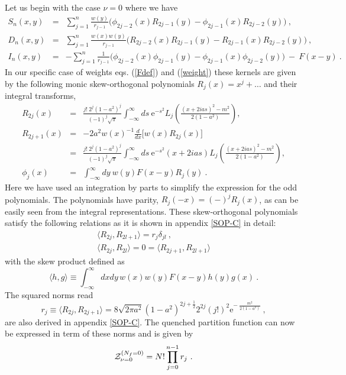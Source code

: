 \documentclass[11pt]{article}
\newcommand{\be}{\begin{equation}}
\newcommand{\ee}{\end{equation}}
\newcommand{\bea}{\begin{eqnarray}}
\newcommand{\eea}{\end{eqnarray}}
\newcommand{\nn}{\nonumber}
\newcommand{\e}{\mbox{e}}
\begin{document}
Let us begin with the case $\nu=0$ where we have \cite{NF98}
\bea
S_n(x,y)&=& \sum_{j=1}^n\frac{w(y)}{r_{j-1}}
\Big(\phi_{2j-2}(x)R_{2j-1}(y)-\phi_{2j-1}(x)R_{2j-2}(y)
\Big)\ ,\nn\\
D_n(x,y)&=& \sum_{j=1}^n\frac{w(x)w(y)}{r_{j-1}}
\Big(R_{2j-2}(x)R_{2j-1}(y)-R_{2j-1}(x)R_{2j-2}(y)
\Big)\ ,\nn\\
I_n(x,y)&=&- \sum_{j=1}^n\frac{1}{r_{j-1}}
\Big(\phi_{2j-2}(x)\phi_{2j-1}(y)-\phi_{2j-1}(x)\phi_{2j-2}(y)
\Big)\ -\ F(x-y)\ .
\label{3kernels}
\eea
In our specific case of weights eqs. (\ref{Fdef}) and (\ref{weight})
these kernels are given by the following monic
skew-orthogonal polynomials $R_j(x)=x^j+\ldots$ and their integral transforms,
\bea
R_{2j}(x)&=&\frac{j!\ 2^j(1-a^2)^j}{(-1)^j\sqrt{\pi}}
\int_{-\infty}^\infty ds\ \e^{-s^2}L_j\left(
  \frac{(x+2ias)^2-m^2}{2(1-a^2)}\right) , \label{sOPs}\\
R_{2j+1}(x)&=&-2a^2w(x)^{-1}
\frac{d}{dx}\Big[
w(x)R_{2j}(x)\Big]\nn\\
&=&\frac{j!\ 2^j(1-a^2)^j}{(-1)^j\sqrt{\pi}}
\int_{-\infty}^\infty ds\ \e^{-s^2}(x+2ias)L_j\left(
  \frac{(x+2ias)^2-m^2}{2(1-a^2)}\right),
\nn\\
\phi_j(x)&=&\int_{-\infty}^\infty dy\ w(y)F(x-y)R_j(y)\ .
\label{trafo}
\eea
Here we have used an integration by parts to simplify the expression
for the odd polynomials. The polynomials have 
parity, $R_j(-x)=(-)^jR_j(x)$, as can be easily seen from the integral
representations.
These skew-orthogonal polynomials satisfy the following relations as
it is shown in appendix \ref{SOP-C} in detail:
\bea
\langle R_{2j}, R_{2l+1}\rangle=r_j\delta_{jl}\ ,\nn\\
\langle R_{2j}, R_{2l}\rangle=0=\langle R_{2j+1}, R_{2l+1}\rangle
\label{skewdef}
\eea
with the skew product defined as
\be
\langle h,g\rangle\equiv \int_{-\infty}^\infty dxdy\,
w(x)w(y)F(x-y)h(y)g(x)\ .
\label{skew}
\ee
The squared norms read
\be
r_j\equiv\langle R_{2j}, R_{2j+1}\rangle=8\sqrt{2\pi a^2}
(1-a^2)^{2j+\frac12}2^{2j}
(j!)^2 \e^{-\ \frac{m^2}{2(1-a^2)}}\ ,
\label{norm}
\ee
are also derived in 
appendix \ref{SOP-C}. The quenched partition function can now
be expressed in term of these norms and is given by
\be
{\cal Z}^{(N_f=0)}_{\nu=0}=N! \prod_{j=0}^{n-1}r_j\ .
\ee
\end{document}
